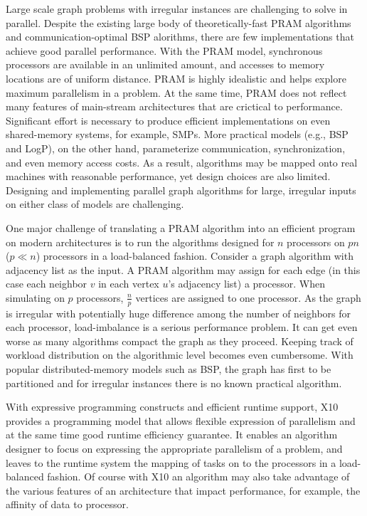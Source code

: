 \documentclass{llncs}
\begin{document}
 Large scale graph problems with irregular instances are challenging to solve in parallel. Despite the existing large body of theoretically-fast PRAM algorithms and communication-optimal BSP alorithms, there are few implementations that achieve good parallel performance. With the PRAM model, synchronous processors are available in an unlimited amount, and accesses to memory locations are of uniform distance. PRAM is highly idealistic and helps explore maximum parallelism in a problem. At the same time,  PRAM does not reflect many features of main-stream architectures that are crictical to performance. Significant effort is necessary to produce efficient implementations on even shared-memory systems, for example, SMPs. More practical models (e.g., BSP and LogP), on the other hand, parameterize communication, synchronization, and even memory access costs. As a result, algorithms may be mapped onto real machines with reasonable performance, yet design choices are also limited. Designing and implementing parallel graph algorithms for large, irregular inputs on either class of models are challenging. 

 One major challenge of translating a PRAM algorithm into an efficient program on modern architectures is to run the algorithms designed for $n$ processors on $pn$ ($p\ll n$) processors in a load-balanced fashion. Consider a graph algorithm with adjacency list as the input. A PRAM algorithm may assign for each edge (in this case each neighbor $v$ in each vertex $u$'s adjacency list) a processor. When simulating on $p$ processors, $\frac{n}{p}$ vertices are assigned to one processor. As the graph is irregular with potentially huge difference among the number of neighbors for each processor, load-imbalance is a serious performance problem. It can get even worse as many algorithms compact the graph as they proceed. Keeping track of workload distribution on the algorithmic level becomes even cumbersome. With popular distributed-memory models such as BSP, the graph has first to be partitioned and for irregular instances there is no known practical algorithm.  

 With expressive programming constructs and efficient runtime support, X10 provides a programming model that allows flexible expression of parallelism and at the same time good runtime efficiency guarantee. It enables an algorithm designer to focus on expressing the appropriate parallelism of a problem, and leaves to the runtime system the mapping of tasks on to the processors in a load-balanced fashion. Of course with X10 an algorithm may also take advantage of the various features of an architecture that impact performance, for example, the affinity of data to processor.
\end{document}
